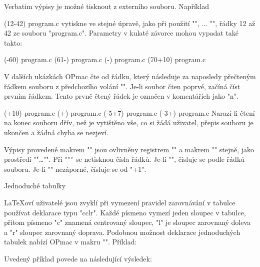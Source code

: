 Verbatim výpisy je možné tisknout z externího souboru. Například

\begtt
\verbinput (12-42) program.c
\endtt
%
vytiskne ve stejné úpravě, jako při použití "\begtt", ... "\endtt", 
řádky 12 až 42 ze souboru "program.c". 
Parametry v kulaté závorce mohou vypadat také takto:

\begtt
\verbinput (-60) program.c   % výpis od začátku souboru do řádku 60
\verbinput (61-) program.c   % výpis od řádku 61 do konce souboru
\verbinput (-) program.c     % výpis celého souboru
\verbinput (70+10) program.c % výpis od řádku 70, tiskne 10 řádků
\endtt

V dalších ukázkách OPmac čte od řádku, který následuje za naposledy
přečteným řádkem souboru z předchozího volání "\verbinput". Je-li soubor
čten poprvé, začíná číst prvním řádkem. Tento prvně čtený 
řádek je označen v komentářích jako "n".

\begtt
\verbinput (+10) program.c  % výpis deseti řádků od řádku n
\verbinput (+) program.c    % výpis od řádku n do konce souboru
\vebrinput (-5+7) program.c %
\verbinput (-3+) program.c  % vynechá 3 řádky, tiskne do konce souboru
\endtt
%
Narazí-li čtení na konec souboru dřív, než je vytištěno vše, co si žádá
uživatel, přepis souboru je ukončen a žádná chyba se nezjeví. 

Výpisy provedené makrem "\verbinput" jsou ovlivněny registrem
"\ttindent" a makrem "\tthook" stejně, jako prostředí "\begtt"\dots"\endtt".
Při "\ttline"{\tt\char`} se netisknou čísla řádků. Je-li "", čísluje se podle
řádků souboru. Je-li "\ttline" nezáporné, čísluje se od "\ttline+1".


\sec Jednoduché tabulky

\LaTeX{}oví uživatelé jsou zvyklí při vymezení pravidel zarovnávání v
tabulce používat deklarace typu "{cclr}". Každé písmeno vymezí jeden sloupec
v tabulce, přitom písmeno "c" znamená centrovaný sloupec, "l" je sloupec
zarovnaný doleva a "r" sloupec zarovnaný doprava.
Podobnou možnost deklarace jednoduchých tabulek nabízí
OPmac v makru "". Příklad:

\begtt
{}
\endtt

Uvedený příklad povede na následující výsledek:

